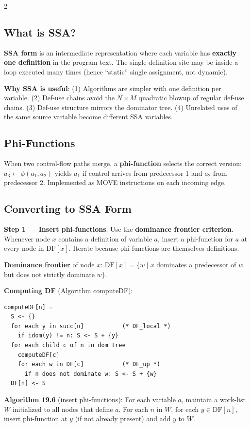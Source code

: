 \documentclass[9pt,landscape]{extarticle}
\begin{document}
\begin{multicols}{2}
\subsection{What is SSA?}

\textbf{SSA form} is an intermediate representation where each variable has \textbf{exactly one definition} in the program text. The single definition site may be inside a loop executed many times (hence ``static'' single assignment, not dynamic).

\textbf{Why SSA is useful}: (1) Algorithms are simpler with one definition per variable. (2) Def-use chains avoid the $N \times M$ quadratic blowup of regular def-use chains. (3) Def-use structure mirrors the dominator tree. (4) Unrelated uses of the same source variable become different SSA variables.

\subsection{Phi-Functions}

When two control-flow paths merge, a \textbf{phi-function} selects the correct version: $a_3 \leftarrow \phi(a_1, a_2)$ yields $a_1$ if control arrives from predecessor 1 and $a_2$ from predecessor 2. Implemented as MOVE instructions on each incoming edge.

\subsection{Converting to SSA Form}

\textbf{Step 1 --- Insert phi-functions}: Use the \textbf{dominance frontier criterion}. Whenever node $x$ contains a definition of variable $a$, insert a phi-function for $a$ at every node in $\text{DF}[x]$. Iterate because phi-functions are themselves definitions.

\textbf{Dominance frontier} of node $x$: $\text{DF}[x] = \{w \mid x$ dominates a predecessor of $w$ but does not strictly dominate $w\}$.

\textbf{Computing DF} (Algorithm computeDF):
\begin{lstlisting}
computeDF[n] =
  S <- {}
  for each y in succ[n]           (* DF_local *)
    if idom(y) != n: S <- S + {y}
  for each child c of n in dom tree
    computeDF[c]
    for each w in DF[c]           (* DF_up *)
      if n does not dominate w: S <- S + {w}
  DF[n] <- S
\end{lstlisting}

\textbf{Algorithm 19.6} (insert phi-functions): For each variable $a$, maintain a work-list $W$ initialized to all nodes that define $a$. For each $n$ in $W$, for each $y \in \text{DF}[n]$, insert phi-function at $y$ (if not already present) and add $y$ to $W$.


\end{multicols}
\end{document}
